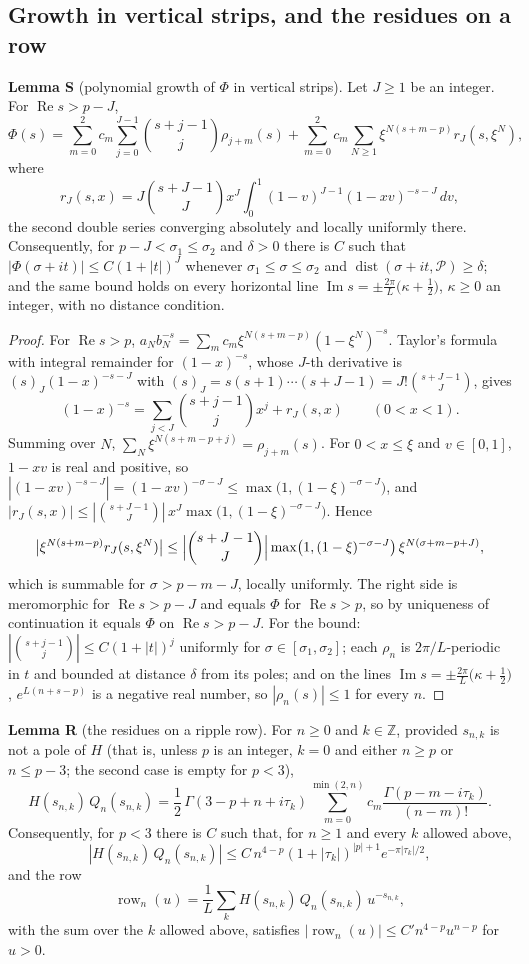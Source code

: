 \documentclass[11pt]{article}
\newcommand{\re}{\operatorname{Re}}
\newcommand{\im}{\operatorname{Im}}
\newcommand{\dist}{\operatorname{dist}}
\newcommand{\row}{\operatorname{row}}
\begin{document}
\subsection{Growth in vertical strips, and the residues on a row}

\noindent\textbf{Lemma S} (polynomial growth of $\Phi$ in vertical strips). Let $J\ge1$ be an integer. For $\re s>p-J$,
\[
\Phi(s)=\sum_{m=0}^{2}c_m\sum_{j=0}^{J-1}\binom{s+j-1}{j}\rho_{j+m}(s)+\sum_{m=0}^{2}c_m\sum_{N\ge1}\xi^{N(s+m-p)}r_J(s,\xi^N),
\]
where
\[
r_J(s,x)=J\binom{s+J-1}{J}x^J\int_0^1(1-v)^{J-1}(1-xv)^{-s-J}\,dv,
\]
the second double series converging absolutely and locally uniformly there. Consequently, for $p-J<\sigma_1\le\sigma_2$ and $\delta>0$ there is $C$ such that $|\Phi(\sigma+it)|\le C(1+|t|)^J$ whenever $\sigma_1\le\sigma\le\sigma_2$ and $\dist(\sigma+it,\mathcal{P})\ge\delta$; and the same bound holds on every horizontal line $\im s=\pm\frac{2\pi}{L}\bigl(\kappa+\frac12\bigr)$, $\kappa\ge0$ an integer, with no distance condition.

\begin{proof}
For $\re s>p$, $a_Nb_N^{-s}=\sum_mc_m\xi^{N(s+m-p)}(1-\xi^N)^{-s}$. Taylor's formula with integral remainder for $(1-x)^{-s}$, whose $J$-th derivative is $(s)_J(1-x)^{-s-J}$ with $(s)_J=s(s+1)\cdots(s+J-1)=J!\binom{s+J-1}{J}$, gives
\[
(1-x)^{-s}=\sum_{j<J}\binom{s+j-1}{j}x^j+r_J(s,x)\qquad(0<x<1).
\]
Summing over $N$, $\sum_N\xi^{N(s+m-p+j)}=\rho_{j+m}(s)$. For $0<x\le\xi$ and $v\in[0,1]$, $1-xv$ is real and positive, so $|(1-xv)^{-s-J}|=(1-xv)^{-\sigma-J}\le\max\bigl(1,(1-\xi)^{-\sigma-J}\bigr)$, and $|r_J(s,x)|\le|\binom{s+J-1}{J}|\,x^J\max\bigl(1,(1-\xi)^{-\sigma-J}\bigr)$. Hence
\[
\bigl|\xi^{N(s+m-p)}r_J(s,\xi^N)\bigr|\le\Bigl|\binom{s+J-1}{J}\Bigr|\max\bigl(1,(1-\xi)^{-\sigma-J}\bigr)\,\xi^{N(\sigma+m-p+J)},
\]
which is summable for $\sigma>p-m-J$, locally uniformly. The right side is meromorphic for $\re s>p-J$ and equals $\Phi$ for $\re s>p$, so by uniqueness of continuation it equals $\Phi$ on $\re s>p-J$. For the bound: $|\binom{s+j-1}{j}|\le C(1+|t|)^j$ uniformly for $\sigma\in[\sigma_1,\sigma_2]$; each $\rho_n$ is $2\pi/L$-periodic in $t$ and bounded at distance $\delta$ from its poles; and on the lines $\im s=\pm\frac{2\pi}{L}\bigl(\kappa+\frac12\bigr)$, $e^{L(n+s-p)}$ is a negative real number, so $|\rho_n(s)|\le1$ for every $n$.
\end{proof}

\noindent\textbf{Lemma R} (the residues on a ripple row). For $n\ge0$ and $k\in\mathbb{Z}$, provided $s_{n,k}$ is not a pole of $H$ (that is, unless $p$ is an integer, $k=0$ and either $n\ge p$ or $n\le p-3$; the second case is empty for $p<3$),
\begin{equation*}
H(s_{n,k})\,Q_n(s_{n,k})=\frac12\,\Gamma(3-p+n+i\tau_k)\sum_{m=0}^{\min(2,n)}c_m\frac{\Gamma(p-m-i\tau_k)}{(n-m)!}. \tag{R}
\end{equation*}
Consequently, for $p<3$ there is $C$ such that, for $n\ge1$ and every $k$ allowed above,
\[
|H(s_{n,k})\,Q_n(s_{n,k})|\le C\,n^{4-p}(1+|\tau_k|)^{|p|+1}e^{-\pi|\tau_k|/2},
\]
and the row
\[
\row_n(u)=\frac1L\sum_kH(s_{n,k})\,Q_n(s_{n,k})\,u^{-s_{n,k}},
\]
with the sum over the $k$ allowed above, satisfies $|\row_n(u)|\le C'n^{4-p}u^{n-p}$ for $u>0$.
\end{document}
